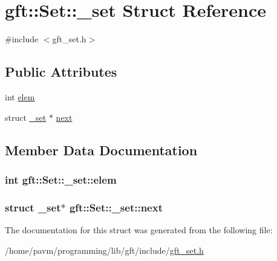 \hypertarget{structgft_1_1Set_1_1__set}{\section{gft\-:\-:Set\-:\-:\-\_\-set Struct Reference}
\label{structgft_1_1Set_1_1__set}
}


{\ttfamily \#include $<$gft\-\_\-set.\-h$>$}

\subsection*{Public Attributes}
\begin{DoxyCompactItemize}
\item 
int \hyperlink{structgft_1_1Set_1_1__set_a3ca042a9f1ac1a205a10b3d2fb32390a}{elem}
\item 
struct \hyperlink{structgft_1_1Set_1_1__set}{\-\_\-set} $\ast$ \hyperlink{structgft_1_1Set_1_1__set_a818575e5f6e37c77e5e47387bdded95f}{next}
\end{DoxyCompactItemize}


\subsection{Member Data Documentation}
\hypertarget{structgft_1_1Set_1_1__set_a3ca042a9f1ac1a205a10b3d2fb32390a}{
\subsubsection[{elem}]{\setlength{\rightskip}{0pt plus 5cm}int gft\-::\-Set\-::\-\_\-set\-::elem}}\label{structgft_1_1Set_1_1__set_a3ca042a9f1ac1a205a10b3d2fb32390a}
\hypertarget{structgft_1_1Set_1_1__set_a818575e5f6e37c77e5e47387bdded95f}{
\subsubsection[{next}]{\setlength{\rightskip}{0pt plus 5cm}struct {\bf \-\_\-set}$\ast$ gft\-::\-Set\-::\-\_\-set\-::next}}\label{structgft_1_1Set_1_1__set_a818575e5f6e37c77e5e47387bdded95f}


The documentation for this struct was generated from the following file\-:\begin{DoxyCompactItemize}
\item 
/home/pavm/programming/lib/gft/include/\hyperlink{gft__set_8h}{gft\-\_\-set.\-h}\end{DoxyCompactItemize}
